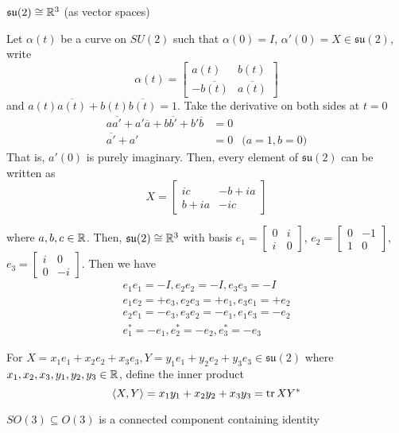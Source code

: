 \documentclass{article}
\begin{document}
\begin{longproof}
\begin{claim}
    $\mathfrak{su}(2) \cong \mathbb{R}^3$ (as vector spaces)
\end{claim}
Let $\alpha(t)$ be a curve on $SU(2)$ such that $\alpha(0) = I$, $\alpha'(0) = X \in \mathfrak{su}(2)$, write
$$
    \alpha(t) = \begin{bmatrix}
        a(t) & b(t) \\
        -\overline{b(t)} & \overline{a(t)}
    \end{bmatrix}
$$
and $a(t) \overline{a(t)} + b(t) \overline{b(t)} = 1$. Take the derivative on both sides at $t = 0$
\begin{align*}
    a \overline{a'} + a' \overline{a} + b \overline{b'} + b' \overline{b} &= 0 \\
    \overline{a'} + a' &= 0 &\text{($a = 1, b = 0$)}
\end{align*}
That is, $a'(0)$ is purely imaginary. Then, every element of $\mathfrak{su}(2)$ can be written as
$$
    X = \begin{bmatrix}
        ic & -b + ia \\
        b + ia & - ic
    \end{bmatrix}
$$

where $a, b, c \in \mathbb{R}$. Then, $\mathfrak{su}(2) \cong \mathbb{R}^3$ with basis $e_1 = \begin{bmatrix} 0 & i \\ i & 0 \end{bmatrix}$, $e_2 = \begin{bmatrix} 0 & -1 \\ 1 & 0 \end{bmatrix}$, $e_3 = \begin{bmatrix} i & 0 \\ 0 & -i \end{bmatrix}$. Then we have
\begin{align*}
    e_1 e_1 = -I, e_2 e_2 = -I, e_3 e_3 = -I \\
    e_1 e_2 = +e_3, e_2 e_3 = +e_1, e_3 e_1 = +e_2 \\
    e_2 e_1 = -e_3, e_3 e_2 = -e_1, e_1 e_3 = -e_2 \\
    e_1^* = -e_1, e_2^* = -e_2, e_3^* = -e_3
\end{align*}

For $X = x_1 e_1 + x_2 e_2 + x_3 e_3, Y = y_1 e_1 + y_2 e_2 + y_3 e_3 \in \mathfrak{su}(2)$ where $x_1, x_2, x_3, y_1, y_2, y_3 \in \mathbb{R}$, define the inner product 
$$
    \langle X, Y\rangle = x_1 y_1 + x_2 y_2 + x_3 y_3 = \operatorname{tr} XY^*
$$


\begin{lemma}
    $SO(3) \subseteq O(3)$ is a connected component containing identity
    \label{lemma_1}
\end{lemma}


\end{longproof}
\end{document}
